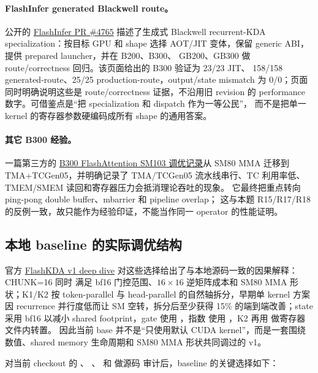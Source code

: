 \paragraph{FlashInfer generated Blackwell route。}
公开的
\href{https://github.com/flashinfer-ai/flashinfer/pull/4765}{FlashInfer PR \#4765}
描述了生成式 Blackwell recurrent-KDA specialization：按目标 GPU 和 shape
选择 AOT/JIT 变体，保留 generic ABI，提供 prepared launcher，并在 B200、B300、
GB200、GB300 做 route/correctness 回归。该页面给出的 B300 验证为 23/23 JIT、
158/158 generated-route、25/25 production-route，output/state mismatch 为
0/0；页面同时明确说明这些是 route/correctness 证据，不沿用旧 revision 的
performance 数字。可借鉴点是“把 specialization 和 dispatch 作为一等公民”，
而不是把单一 kernel 的寄存器参数硬编码成所有 shape 的通用答案。

\paragraph{其它 B300 经验。}
一篇第三方的
\href{https://www.hjcheng0602.cn/blog/flashattn_G4/}{B300 FlashAttention
SM103 调优记录}从 SM80 MMA 迁移到 TMA+TCGen05，并明确记录了 TMA/TCGen05
流水线串行、TC 利用率低、TMEM/SMEM 读回和寄存器压力会抵消理论吞吐的现象。
它最终把重点转向 ping-pong double buffer、mbarrier 和 pipeline overlap；
这与本题 R15/R17/R18 的反例一致，故只能作为经验印证，不能当作同一 operator
的性能证明。

\subsection{本地 baseline 的实际调优结构}

官方
\href{https://github.com/MoonshotAI/FlashKDA/blob/master/docs/20260420-flashkda-v1-deep-dive.md}{FlashKDA
v1 deep dive} 对这些选择给出了与本地源码一致的因果解释：CHUNK=16 同时
满足 bf16 门控范围、\(16\times16\) 逆矩阵成本和 SM80 MMA 形状；K1/K2
按 token-parallel 与 head-parallel 的自然轴拆分，早期单 kernel 方案因
recurrence 并行度低而让 SM 空转，拆分后至少获得 15\% 的端到端改善；state
采用 bf16 以减小 shared footprint，gate 使用 ，指数
使用 ，K2 再用  做寄存器文件内转置。
因此当前 base 并不是“只使用默认 CUDA kernel”，而是一套围绕数值、shared
memory 生命周期和 SM80 MMA 形状共同调过的 v1。

对当前 checkout 的 、
、 和  做源码
审计后，baseline 的关键选择如下：

